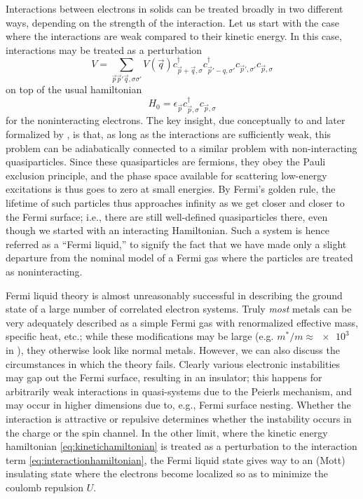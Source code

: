Interactions between electrons in solids can be treated broadly in two different ways, depending on the strength of the interaction.
Let us start with the case where the interactions are weak compared to their kinetic energy.
In this case, interactions may be treated as a perturbation
\begin{equation}\label{eq:interactionhamiltonian}
V = \sum_{\vec{p}\vec{p}'\vec{q},\sigma\sigma'}V(\vec{q})c^\dagger_{\vec{p}+\vec{q},\sigma}c^\dagger_{\vec{p}'-q,\sigma'}c_{\vec{p}',\sigma'}c_{\vec{p},\sigma}
\end{equation}
on top of the usual hamiltonian
\begin{equation}\label{eq:kinetichamiltonian}
H_0 = \epsilon_{\vec{p}} c^\dagger_{\vec{p},\sigma}c_{\vec{p},\sigma}
\end{equation}
for the noninteracting electrons.
The key insight, due conceptually to \citet{landau} and later formalized by \citet{gell-mann}, is that, as long as the interactions are sufficiently weak, this problem can be adiabatically connected to a similar problem with non-interacting quasiparticles.
Since these quasiparticles are fermions, they obey the Pauli exclusion principle, and the phase space available for scattering low-energy excitations is thus goes to zero at small energies.
By Fermi's golden rule, the lifetime of such particles thus approaches infinity as we get closer and closer to the Fermi surface; i.e., there are still well-defined quasiparticles there, even though we started with an interacting Hamiltonian.
Such a system is hence referred as a ``Fermi liquid,'' to signify the fact that we have made only a slight departure from the nominal model of a Fermi gas where the particles are treated as noninteracting.

Fermi liquid theory is almost unreasonably successful in describing the ground state of a large number of correlated electron systems.
Truly \emph{most} metals can be very adequately described as a simple Fermi gas with renormalized effective mass, specific heat, etc.; while these modifications may be large (e.g. $m^*/m\approx\num{e3}$ in ), they otherwise look like normal metals.
However, we can also discuss the circumstances in which the theory fails.
Clearly various electronic instabilities may gap out the Fermi surface, resulting in an insulator; this happens for arbitrarily weak interactions in quasi-\oned systems due to the Peierls mechanism, and may occur in higher dimensions due to, e.g., Fermi surface nesting.
Whether the interaction is attractive or repulsive determines whether the instability occurs in the charge or the spin channel.
In the other limit, where the kinetic energy hamiltonian \ref{eq:kinetichamiltonian} is treated as a perturbation to the interaction term \ref{eq:interactionhamiltonian}, the Fermi liquid state gives way to an (Mott) insulating state where the electrons become localized so as to minimize the coulomb repulsion $U$.

